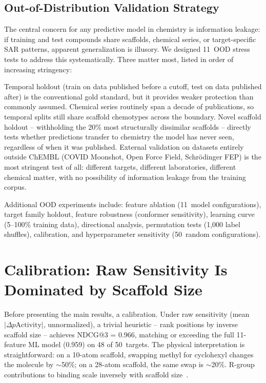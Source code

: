 \documentclass[sigconf, nonacm]{acmart}
\begin{document}
\subsection{Out-of-Distribution Validation Strategy}

The central concern for any predictive model in chemistry is information leakage: if training and test compounds share scaffolds, chemical series, or target-specific SAR patterns, apparent generalization is illusory. We designed 11~OOD stress tests to address this systematically. Three matter most, listed in order of increasing stringency:

Temporal holdout (train on data published before a cutoff, test on data published after) is the conventional gold standard, but it provides weaker protection than commonly assumed. Chemical series routinely span a decade of publications, so temporal splits still share scaffold chemotypes across the boundary. Novel scaffold holdout -- withholding the 20\% most structurally dissimilar scaffolds -- directly tests whether predictions transfer to chemistry the model has never seen, regardless of when it was published. External validation on datasets entirely outside ChEMBL (COVID Moonshot, Open Force Field, Schr\"{o}dinger FEP) is the most stringent test of all: different targets, different laboratories, different chemical matter, with no possibility of information leakage from the training corpus.

Additional OOD experiments include: feature ablation (11~model configurations), target family holdout, feature robustness (conformer sensitivity), learning curve (5--100\% training data), directional analysis, permutation tests (1{,}000 label shuffles), calibration, and hyperparameter sensitivity (50~random configurations).

\section{Calibration: Raw Sensitivity Is Dominated by Scaffold Size}

Before presenting the main results, a calibration. Under raw sensitivity (mean~$|\Delta p\mathrm{Activity}|$, unnormalized), a trivial heuristic -- rank positions by inverse scaffold size -- achieves NDCG@3 = 0.966, matching or exceeding the full 11-feature ML model (0.959) on 48 of 50~targets. The physical interpretation is straightforward: on a 10-atom scaffold, swapping methyl for cyclohexyl changes the molecule by ${\sim}$50\%; on a 28-atom scaffold, the same swap is ${\sim}$20\%. R-group contributions to binding scale inversely with scaffold size~\cite{Hopkins2004}.
\end{document}
